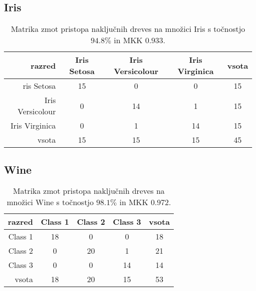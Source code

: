 \subsection{Iris}\label{subsec:random-forest-iris-test}
\begin{table}[H]
    \centering
    \begin{tabular}{||rcccc||}
        \hline
        razred           & Iris Setosa & Iris Versicolour & Iris Virginica & vsota \\ \hline
        ris Setosa       & 15          & 0                & 0              & 15    \\ \hline
        Iris Versicolour & 0           & 14               & 1              & 15    \\ \hline
        Iris Virginica   & 0           & 1                & 14             & 15    \\ \hline
        vsota            & 15          & 15               & 15             & 45    \\ \hline
    \end{tabular}
    \caption{Matrika zmot pristopa naključnih dreves na množici Iris s točnostjo $94.8\%$ in MKK $0.933$.}
    \label{tab:rforest_iris_cm}
\end{table}

\subsection{Wine}\label{subsec:random-forest-wine-test}
\begin{table}[H]
    \centering
    \begin{tabular}{||rcccc||}
        \hline
        razred  & Class 1 & Class 2 & Class 3 & vsota \\ \hline
        Class 1 & 18      & 0       & 0       & 18    \\ \hline
        Class 2 & 0       & 20      & 1       & 21    \\ \hline
        Class 3 & 0       & 0       & 14      & 14    \\ \hline
        vsota   & 18      & 20      & 15      & 53    \\ \hline
    \end{tabular}
    \caption{Matrika zmot pristopa naključnih dreves na množici Wine s točnostjo $98.1\%$ in MKK $0.972$.}
    \label{tab:rforest_wine_cm}
\end{table}


